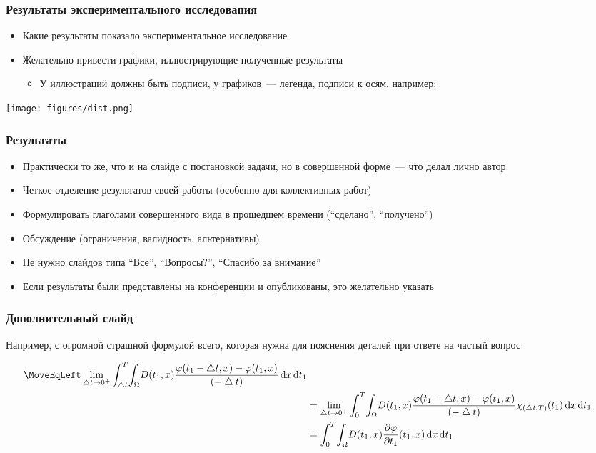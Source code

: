 \documentclass
  [ russian
  , aspectratio=169 %
  ] {beamer}
\begin{document}
\begin{frame}[t]
    \frametitle{Результаты экспериментального исследования}
    \begin{itemize}
        \item Какие результаты показало экспериментальное исследование
        \item Желательно привести графики, иллюстрирующие полученные результаты
              \begin{itemize}
                  \item У иллюстраций должны быть подписи, у графиков~--- легенда, подписи к осям, например:
              \end{itemize}
    \end{itemize}
    \texttt{[image: figures/dist.png]}
\end{frame}

\begin{frame}
    \frametitle{Результаты}
    \begin{itemize}
        \item Практически то же, что и на слайде с постановкой задачи, но в совершенной форме~--- что делал лично автор
        \item Четкое отделение результатов своей работы (особенно для коллективных работ)
        \item Формулировать глаголами совершенного вида в прошедшем времени (\enquote{сделано}, \enquote{получено})
        \item Обсуждение (ограничения, валидность, альтернативы)
        \item Не нужно слайдов типа \enquote{Все}, \enquote{Вопросы?}, \enquote{Спасибо за внимание}
    \end{itemize}

    \begin{itemize}
        \item Если результаты были представлены на конференции и опубликованы, это желательно указать
    \end{itemize}
\end{frame}

\appendix

\begin{frame}
    \frametitle{Дополнительный слайд}
    Например, с огромной страшной формулой всего, которая нужна для пояснения деталей при ответе на частый вопрос

    \begin{align*}
        \MoveEqLeft \lim_{\bigtriangleup t \to 0^+}\int_{\bigtriangleup t}^{T} \! \int_{\Omega} \! D(t_1,x) \frac{\varphi(t_1-\bigtriangleup t,x)-\varphi(t_1,x)}{(-\bigtriangleup t)} \, \mathrm{d}x \, \mathrm{d}t_1 \\
        &= \lim_{\bigtriangleup t \to 0^+} \int_{0}^{T} \! \int_{\Omega} \! D(t_1,x) \frac{\varphi(t_1-\bigtriangleup t,x)-\varphi(t_1,x)}{(-\bigtriangleup t)} \chi_{(\bigtriangleup t,T)}(t_1) \, \mathrm{d}x \, \mathrm{d}t_1 \\
        &=\int_{0}^{T} \! \int_{\Omega} \! D(t_1,x) \frac{\partial \varphi}{\partial t_1} (t_1,x) \, \mathrm{d}x \, \mathrm{d}t_1
    \end{align*}
\end{frame}
\end{document}
